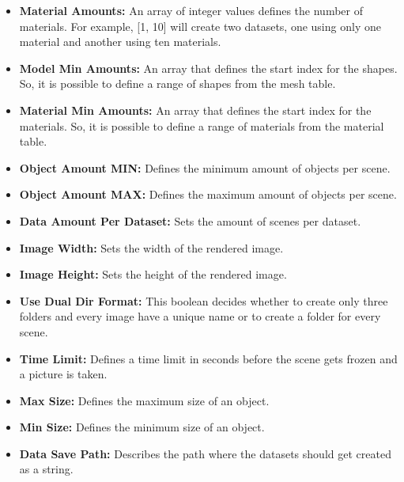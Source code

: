 \begin{itemize}
		\item \textbf{Material Amounts:} An array of integer values defines the number of materials. For example, [1, 10] will create two datasets, one using only one material and another using ten materials.
		\item \textbf{Model Min Amounts:} An array that defines the start index for the shapes. So, it is possible to define a range of shapes from the mesh table.
		\item \textbf{Material Min Amounts:} An array that defines the start index for the materials. So, it is possible to define a range of materials from the material table.
		\item \textbf{Object Amount MIN:} Defines the minimum amount of objects per scene.
		\item \textbf{Object Amount MAX:} Defines the maximum amount of objects per scene.
		\item \textbf{Data Amount Per Dataset:} Sets the amount of scenes per dataset. 
		\item \textbf{Image Width:} Sets the width of the rendered image.
		\item \textbf{Image Height:} Sets the height of the rendered image.
		\item \textbf{Use Dual Dir Format:} This boolean decides whether to create only three folders and every image have a unique name or to create a folder for every scene.
		\item \textbf{Time Limit:} Defines a time limit in seconds before the scene gets frozen and a picture is taken.
		\item \textbf{Max Size:} Defines the maximum size of an object.
		\item \textbf{Min Size:} Defines the minimum size of an object.
		\item \textbf{Data Save Path:} Describes the path where the datasets should get created as a string.
	\end{itemize}